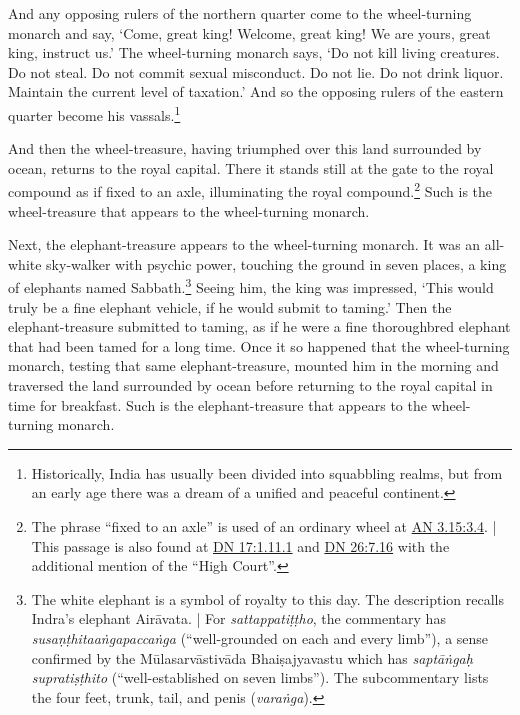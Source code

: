 \documentclass[12pt,openany]{book}%
\begin{document}
And any opposing rulers of the northern quarter come to the wheel-turning monarch and say, ‘Come, great king! Welcome, great king! We are yours, great king, instruct us.’ The wheel-turning monarch says, ‘Do not kill living creatures. Do not steal. Do not commit sexual misconduct. Do not lie. Do not drink liquor. Maintain the current level of taxation.’ And so the opposing rulers of the eastern quarter become his vassals.\footnote{Historically, India has usually been divided into squabbling realms, but from an early age there was a dream of a unified and peaceful continent. } 

And then the wheel-treasure, having triumphed over this land surrounded by ocean, returns to the royal capital. There it stands still at the gate to the royal compound as if fixed to an axle, illuminating the royal compound.\footnote{The phrase “fixed to an axle” is used of an ordinary wheel at \href{https://suttacentral.net/an3.15/en/sujato\#3.4}{AN 3.15:3.4}. | This passage is also found at \href{https://suttacentral.net/dn17/en/sujato\#1.11.1}{DN 17:1.11.1} and \href{https://suttacentral.net/dn26/en/sujato\#7.16}{DN 26:7.16} with the additional mention of the “High Court”. } Such is the wheel-treasure that appears to the wheel-turning monarch. 

Next, the elephant-treasure appears to the wheel-turning monarch. It was an all-white sky-walker with psychic power, touching the ground in seven places, a king of elephants named Sabbath.\footnote{The white elephant is a symbol of royalty to this day. The description recalls Indra’s elephant \textsanskrit{Airāvata}. | For \textit{\textsanskrit{sattappatiṭṭho}}, the commentary has \textit{\textsanskrit{susaṇṭhitaaṅgapaccaṅga}} (“well-grounded on each and every limb”), a sense confirmed by the \textsanskrit{Mūlasarvāstivāda} \textsanskrit{Bhaiṣajyavastu} which has \textit{\textsanskrit{saptāṅgaḥ} \textsanskrit{supratiṣṭhito}} (“well-established on seven limbs”). The subcommentary lists the four feet, trunk, tail, and penis (\textit{\textsanskrit{varaṅga}}). } Seeing him, the king was impressed, ‘This would truly be a fine elephant vehicle, if he would submit to taming.’ Then the elephant-treasure submitted to taming, as if he were a fine thoroughbred elephant that had been tamed for a long time. Once it so happened that the wheel-turning monarch, testing that same elephant-treasure, mounted him in the morning and traversed the land surrounded by ocean before returning to the royal capital in time for breakfast. Such is the elephant-treasure that appears to the wheel-turning monarch. 
\end{document}

